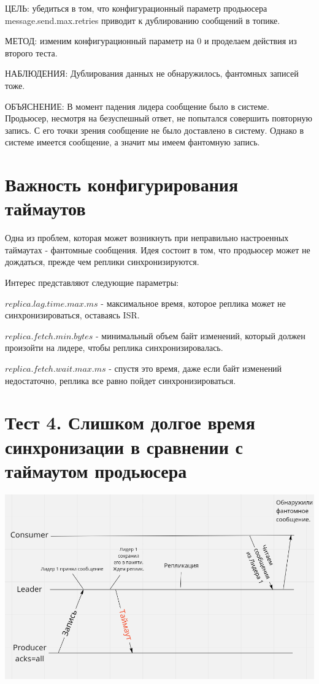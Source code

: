 \documentclass[11pt]{article}
\begin{document}
    ЦЕЛЬ: убедиться в том, что конфигурационный параметр продьюсера message.send.max.retries приводит к дублированию
    сообщений в топике.

    МЕТОД: изменим конфигурационный параметр на 0 и проделаем действия из второго теста.

    НАБЛЮДЕНИЯ: Дублирования данных не обнаружилось, фантомных записей тоже.

    ОБЪЯСНЕНИЕ: В момент падения лидера сообщение было в системе. Продьюсер, несмотря на безуспешный ответ, не
    попытался совершить повторную запись. С его точки зрения сообщение не было доставлено в систему. Однако в системе
    имеется сообщение, а значит мы имеем фантомную запись.

    \section{Важность конфигурирования таймаутов}
    Одна из проблем, которая может возникнуть при неправильно настроенных таймаутах - фантомные сообщения. Идея
    состоит в том, что продьюсер может не дождаться, прежде чем реплики синхронизируются.

    Интерес представляют следующие параметры:

    $replica.lag.time.max.ms$ - максимальное время, которое реплика может не синхронизироваться, оставаясь ISR.

    $replica.fetch.min.bytes$ - минимальный объем байт изменений, который должен произойти на лидере, чтобы реплика
    синхронизировалась.

    $replica.fetch.wait.max.ms$ - спустя это время, даже если байт изменений недостаточно, реплика все равно пойдет
    синхронизироваться.

    \section{Тест 4. Слишком долгое время синхронизации в сравнении с таймаутом продьюсера}

    \includegraphics[width=15cm]{test4}
\end{document}
